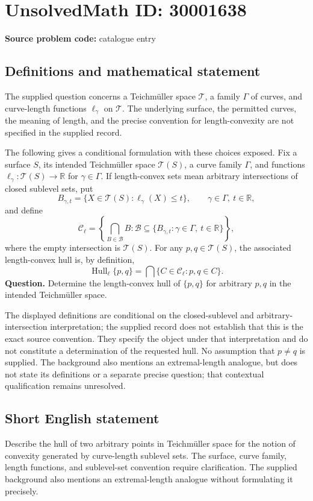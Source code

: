 \documentclass[11pt]{article}
\newcommand{\R}{\mathbb{R}}
\begin{document}
\section*{UnsolvedMath ID: 30001638}
\textbf{Source problem code:} catalogue entry
\subsection{Definitions and mathematical statement}
The supplied question concerns a Teichm\"uller space \(\mathcal T\), a family \(\Gamma\) of curves, and curve-length functions \(\ell_\gamma\) on \(\mathcal T\). The underlying surface, the permitted curves, the meaning of length, and the precise convention for length-convexity are not specified in the supplied record.

The following gives a conditional formulation with these choices exposed. Fix a surface \(S\), its intended Teichm\"uller space \(\mathcal T(S)\), a curve family \(\Gamma\), and functions \(\ell_\gamma:\mathcal T(S)\to\R\) for \(\gamma\in\Gamma\). If length-convex sets mean arbitrary intersections of closed sublevel sets, put
\[
B_{\gamma,t}=\{X\in\mathcal T(S):\ell_\gamma(X)\le t\},\qquad \gamma\in\Gamma,\ t\in\R,
\]
and define
\[
\mathcal C_\ell=\left\{\bigcap_{B\in\mathcal B}B:\mathcal B\subseteq\{B_{\gamma,t}:\gamma\in\Gamma,\ t\in\R\}\right\},
\]
where the empty intersection is \(\mathcal T(S)\). For any \(p,q\in\mathcal T(S)\), the associated length-convex hull is, by definition,
\[
\operatorname{Hull}_\ell\{p,q\}
=\bigcap\{C\in\mathcal C_\ell:p,q\in C\}.
\]
\textbf{Question.} Determine the length-convex hull of \(\{p,q\}\) for arbitrary \(p,q\) in the intended Teichm\"uller space.

The displayed definitions are conditional on the closed-sublevel and arbitrary-intersection interpretation; the supplied record does not establish that this is the exact source convention. They specify the object under that interpretation and do not constitute a determination of the requested hull. No assumption that \(p\ne q\) is supplied. The background also mentions an extremal-length analogue, but does not state its definitions or a separate precise question; that contextual qualification remains unresolved.
\subsection{Short English statement}
Describe the hull of two arbitrary points in Teichm\"uller space for the notion of convexity generated by curve-length sublevel sets. The surface, curve family, length functions, and sublevel-set convention require clarification. The supplied background also mentions an extremal-length analogue without formulating it precisely.
\end{document}

